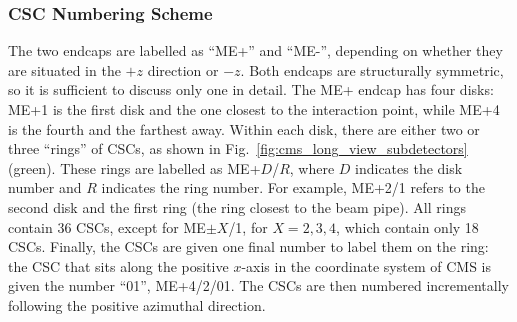 






\subsubsection{CSC Numbering Scheme}
\label{sec:csc_numbering}
The two endcaps are labelled as ``ME+'' and ``ME-'', depending on whether they are situated in the $+z$ direction or $-z$.
Both endcaps are structurally symmetric, so it is sufficient to discuss only one in detail.
The ME+ endcap has four disks: ME+1 is the first disk and the one closest to the interaction point, while ME+4 is the fourth and the farthest away. 
Within each disk, there are either two or three ``rings'' of CSCs, as shown in Fig.~\ref{fig:cms_long_view_subdetectors} (green).
These rings are labelled as ME+$D$/$R$, where $D$ indicates the disk number and $R$ indicates the ring number.
For example, ME+2/1 refers to the second disk and the first ring (the ring closest to the beam pipe).
All rings contain 36 CSCs, except for ME$\pm X$/1, for $X= 2,3,4$, which contain only 18 CSCs.
Finally, the CSCs are given one final number to label them on the ring:
the CSC that sits along the positive $x$-axis in the coordinate system of CMS is given the number ``01'', \eg ME+4/2/01. 
The CSCs are then numbered incrementally following the positive azimuthal direction.

